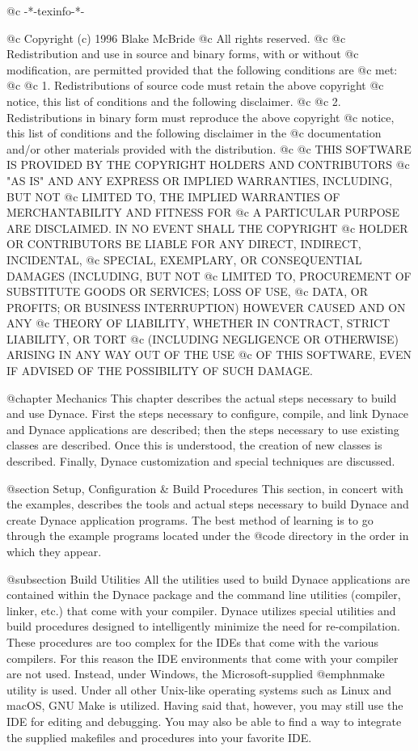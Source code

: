 @c -*-texinfo-*-

@c  Copyright (c) 1996 Blake McBride
@c  All rights reserved.
@c
@c  Redistribution and use in source and binary forms, with or without
@c  modification, are permitted provided that the following conditions are
@c  met:
@c
@c  1. Redistributions of source code must retain the above copyright
@c  notice, this list of conditions and the following disclaimer.
@c
@c  2. Redistributions in binary form must reproduce the above copyright
@c  notice, this list of conditions and the following disclaimer in the
@c  documentation and/or other materials provided with the distribution.
@c
@c  THIS SOFTWARE IS PROVIDED BY THE COPYRIGHT HOLDERS AND CONTRIBUTORS
@c  "AS IS" AND ANY EXPRESS OR IMPLIED WARRANTIES, INCLUDING, BUT NOT
@c  LIMITED TO, THE IMPLIED WARRANTIES OF MERCHANTABILITY AND FITNESS FOR
@c  A PARTICULAR PURPOSE ARE DISCLAIMED. IN NO EVENT SHALL THE COPYRIGHT
@c  HOLDER OR CONTRIBUTORS BE LIABLE FOR ANY DIRECT, INDIRECT, INCIDENTAL,
@c  SPECIAL, EXEMPLARY, OR CONSEQUENTIAL DAMAGES (INCLUDING, BUT NOT
@c  LIMITED TO, PROCUREMENT OF SUBSTITUTE GOODS OR SERVICES; LOSS OF USE,
@c  DATA, OR PROFITS; OR BUSINESS INTERRUPTION) HOWEVER CAUSED AND ON ANY
@c  THEORY OF LIABILITY, WHETHER IN CONTRACT, STRICT LIABILITY, OR TORT
@c  (INCLUDING NEGLIGENCE OR OTHERWISE) ARISING IN ANY WAY OUT OF THE USE
@c  OF THIS SOFTWARE, EVEN IF ADVISED OF THE POSSIBILITY OF SUCH DAMAGE.

@chapter Mechanics
This chapter describes the actual steps necessary to build and use
Dynace.  First the steps necessary to configure, compile, and link Dynace
and Dynace applications are described; then the steps necessary to use
existing classes are described.  Once this is understood, the creation of
new classes is described.  Finally, Dynace customization and special
techniques are discussed.


@section Setup, Configuration & Build Procedures
This section, in concert with the examples, describes the tools and
actual steps necessary to build Dynace and create Dynace application
programs.  The best method of learning is to go through the example
programs located under the @code{\DYNACE\EXAMPLES} directory in the
order in which they appear.

@subsection Build Utilities
All the utilities used to build Dynace applications are contained
within the Dynace package and the command line utilities (compiler,
linker, etc.) that come with your compiler.  Dynace utilizes special
utilities and build procedures designed to intelligently minimize the
need for re-compilation.  These procedures are too complex for the IDEs
that come with the various compilers.  For this reason the IDE
environments that come with your compiler are not used.  Instead,
under Windows, the Microsoft-supplied @emph{nmake} utility is used.  Under all
other Unix-like operating systems such as Linux and macOS, GNU Make is
utilized.  Having said that, however, you may still use the IDE for
editing and debugging.  You may also be able to find a way to
integrate the supplied makefiles and procedures into your favorite
IDE.

